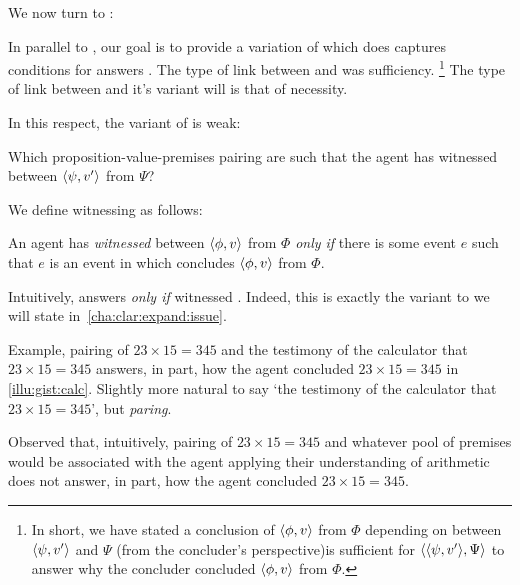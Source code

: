 \begin{note}[Introduction]
  We now turn to \qHow{}:
  \vspace{-\baselineskip}
  \begin{quote}
    \questionHowBasic*
  \end{quote}

  In parallel to \qWhyV{}, our goal is to provide a variation of \qHow{} which does captures conditions for answers \qHow{}.
  The type of link between \qWhyV{} and \qWhy{} was sufficiency.%
  \footnote{
    In short, we have stated a conclusion of \(\langle \phi, v \rangle\) from \(\Phi\) {\color{red} depending} on \support{} between \(\langle \psi, v' \rangle\) and \(\Psi\) (from the concluder's perspective)is sufficient for \(\langle \langle \psi, v' \rangle, \Psi \rangle\) to answer why the concluder concluded \(\langle \phi, v \rangle\) from \(\Phi\).
  }
  The type of link between \qHow{} and it's variant will is that of necessity.

  In this respect, the variant of \qHow{} is weak:

  \begin{question}[\qHowV{}]
    \label{q:how:v}
    Which proposition-value-premises pairing are such that the agent has witnessed \support{} between \(\langle \psi, v' \rangle\) from \(\Psi\)?
  \end{question}

  We define witnessing as follows:

  \begin{definition}[Witnessing]
    \label{def:witnessing}
    An agent has \emph{witnessed} \support{} between \(\langle \phi, v \rangle\) from \(\Phi\) \emph{only if} there is some event \(e\) such that \(e\) is an event in which \vAgent{} concludes \(\langle \phi, v \rangle\) from \(\Phi\).
  \end{definition}

  Intuitively, \support{} answers \qWhyV{} \emph{only if} witnessed \support{}.
  Indeed, this is exactly the variant to \issueInclusion{} we will state in~\autoref{cha:clar:expand:issue}.
\end{note}


\begin{note}
  Example, pairing of \(23 \times 15 = 345\) and the testimony of the calculator that \(23 \times 15 = 345\) answers, in part, how the agent concluded \(23 \times 15 = 345\) in \autoref{illu:gist:calc}.
  Slightly more natural to say `the testimony of the calculator that \(23 \times 15 = 345\)', but \emph{paring}.

  Observed that, intuitively, pairing of \(23 \times 15 = 345\) and whatever pool of premises would be associated with the agent applying their understanding of arithmetic does not answer, in part, how the agent concluded \(23 \times 15 = 345\).
\end{note}

